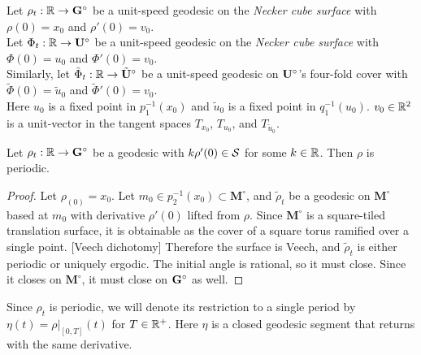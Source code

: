 \documentclass[a4paper, 11pt]{article}
\def\bMs{\mathbf{M}^\circ}
\def\btUs{\btU^\circ}
\def\utild{\tilde{u}_0}
\def\phitild{\tilde{\Phi}}
\begin{document}
\begin{Def}
Let $\rho_t:\mathbb{R}\rightarrow\mathbf{G}^\circ$ be a unit-speed geodesic on the \emph{Necker cube surface} with $\rho(0)=x_0$ and $\rho'(0)=v_0$.\\
Let $\Phi_t:\mathbb{R}\rightarrow\mathbf{U}^\circ$ be a unit-speed geodesic on the \emph{Necker cube surface} with $\Phi(0)=u_0$ and $\Phi'(0)=v_0$. \\Similarly, let $\tilde{\Phi}_t:\RR\rightarrow\btUs$ be a unit-speed geodesic on $\mathbf{U}^\circ$'s four-fold cover with $\phitild(0)=\utild$ and $\phitild'(0)=v_0$.\\
Here $u_0$ is a fixed point in $p_1^{-1}(x_0)$ and $\utild$ is a fixed point in $q_1^{-1}(u_0)$. $v_0\in\mathbb{R}^2$ is a unit-vector in the tangent spaces $T_{x_0}$, $T_{u_0}$, and $T_{\utild}$.
\end{Def}

\begin{thm}
Let $\rho_t:\mathbb{R}\rightarrow\mathbf{G}^\circ$ be a geodesic with $k\rho'(0)\in\mathcal{S}$ for some $k\in\mathbb{R}$. Then $\rho$ is periodic.
\begin{proof}
Let $\rho_(0)=x_0$. Let $m_0\in p_2^{-1}(x_0)\subset\bMs$, and $\tilde{\rho}_t$ be a geodesic on $\bMs$ based at $m_0$ with derivative $\rho'(0)$ lifted from $\rho$. Since $\bMs$ is a square-tiled translation surface, it is obtainable as the cover of a square torus ramified over a single point. [Veech dichotomy] Therefore the surface is Veech, and $\tilde{\rho}_t$ is either periodic or uniquely ergodic. The initial angle is rational, so it must close. Since it closes on $\bMs$, it must close on $\mathbf{G}^\circ$ as well.
\end{proof}
\end{thm}

Since $\rho_t$ is periodic, we will denote its restriction to a single period by $\eta(t)=\rho\vert_{[0,T]}(t)$ for $T\in\mathbb{R}^+$. Here $\eta$ is a closed geodesic segment that returns with the same derivative.
\end{document}
